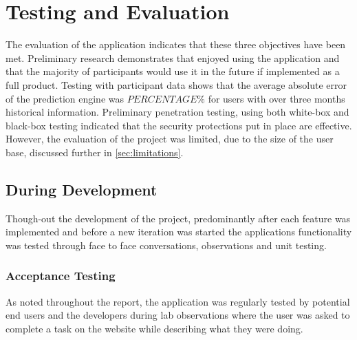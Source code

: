 \chapter{Testing and Evaluation}
\label{cha:testing}

\begin{comment}
Chapter 6: Testing and Evaluation
This chapter should give details of how the system designed and implemented by you was tested. The data and results obtained from this testing whould be presented and consideration be given as to whether or not these results confirm that everything works correctly.

The analysis of test results is very important and some assessment of their significance and quality must be given. Likely sources of error and inaccuracy should be mentioned. Use graphs, bar charts and histograms where appropriate, remembering to label all axes and give scales. The analysis is often done badly, thus sacrificing marks.
\end{comment}

The evaluation of the application indicates that these three objectives have been met. Preliminary research demonstrates that enjoyed using the application and that the majority of participants would use it in the future if implemented as a full product. Testing with participant data shows that the average absolute error of the prediction engine was $PERCENTAGE\%$ for users with over three months historical information. Preliminary penetration testing, using both white-box and black-box testing indicated that the security protections put in place are effective.  However, the evaluation of the project was limited, due to the size of the user base, discussed further in \autoref{sec:limitations}. 

\section{During Development}
Though-out the development of the project, predominantly after each feature was implemented and before a new iteration was started the applications functionality was tested through face to face conversations, observations and unit testing.

\subsection{Acceptance Testing}
As noted throughout the report, the application was regularly tested by potential end users and the developers during lab observations where the user was asked to complete a task on the website while describing what they were doing. 

